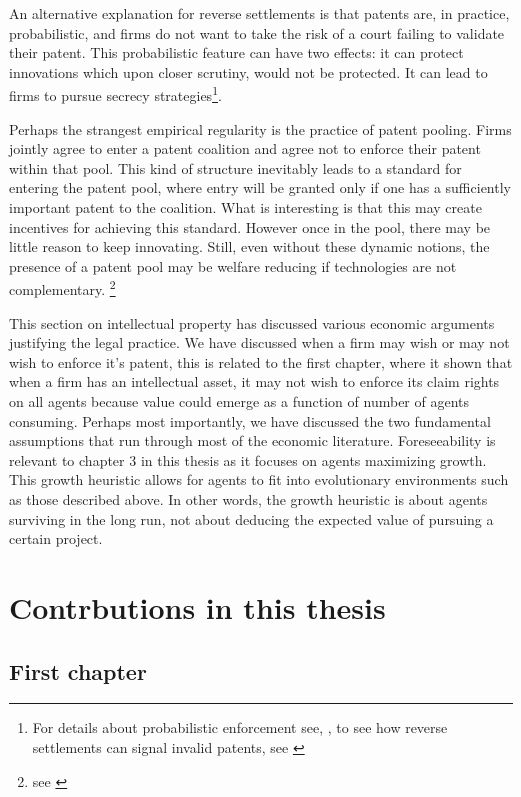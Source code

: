 An alternative explanation for reverse settlements is that patents are, in practice, probabilistic, and firms do not want to take the risk of a court failing to validate their patent. This probabilistic feature can have two effects: it can protect innovations which upon closer scrutiny, would not be protected. It can lead to firms to pursue secrecy strategies\footnote{For details about probabilistic enforcement see, \cite{Lemley2005}, to see how reverse settlements can signal invalid patents, see \cite{Dolin2011}}.

Perhaps the strangest empirical regularity is the practice of patent pooling. Firms jointly agree to enter a patent coalition and agree not to enforce their patent within that pool. This kind of structure inevitably leads to a standard for entering the patent pool, where entry will be granted only if one has a sufficiently important patent to the coalition. What is interesting is that this may create incentives for achieving this standard. However once in the pool, there may be little reason to keep innovating. Still, even without these dynamic notions, the presence of a patent pool may be welfare reducing if technologies are not complementary. \footnote{see \cite{Lerner2004}}

This section on intellectual property has discussed various economic arguments justifying the legal practice. We have discussed when a firm may wish or may not wish to enforce it's patent, this is related to the first chapter, where it shown that when a firm has an intellectual asset, it may not wish to enforce its claim rights on all agents because value could emerge as a function of number of agents consuming. Perhaps most importantly, we have discussed the two fundamental assumptions that run through most of the economic literature. Foreseeability is relevant to chapter 3 in this thesis as it focuses on agents maximizing growth. This growth heuristic allows for agents to fit into evolutionary environments such as those described above. In other words, the growth heuristic is about agents surviving in the long run, not about deducing the expected value of pursuing a certain project. 

\newpage

\section{Contrbutions in this thesis}

\subsection{First chapter}

